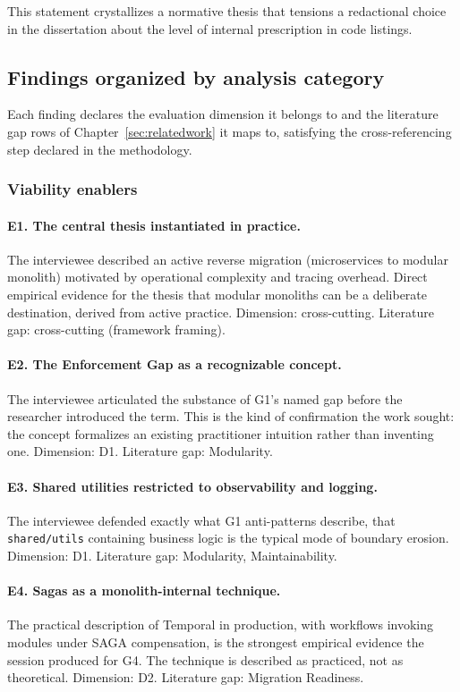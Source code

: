 This statement crystallizes a normative thesis that tensions a redactional choice in the dissertation about the level of internal prescription in code listings.

\subsection*{Findings organized by analysis category}

Each finding declares the evaluation dimension it belongs to and the literature gap rows of Chapter~\ref{sec:relatedwork} it maps to, satisfying the cross-referencing step declared in the methodology.

\subsubsection*{Viability enablers}

\paragraph*{E1. The central thesis instantiated in practice.} The interviewee described an active reverse migration (microservices to modular monolith) motivated by operational complexity and tracing overhead. Direct empirical evidence for the thesis that modular monoliths can be a deliberate destination, derived from active practice. Dimension: cross-cutting. Literature gap: cross-cutting (framework framing).

\paragraph*{E2. The Enforcement Gap as a recognizable concept.} The interviewee articulated the substance of G1's named gap before the researcher introduced the term. This is the kind of confirmation the work sought: the concept formalizes an existing practitioner intuition rather than inventing one. Dimension: D1. Literature gap: Modularity.

\paragraph*{E3. Shared utilities restricted to observability and logging.} The interviewee defended exactly what G1 anti-patterns describe, that \texttt{shared/utils} containing business logic is the typical mode of boundary erosion. Dimension: D1. Literature gap: Modularity, Maintainability.

\paragraph*{E4. Sagas as a monolith-internal technique.} The practical description of Temporal in production, with workflows invoking modules under SAGA compensation, is the strongest empirical evidence the session produced for G4. The technique is described as practiced, not as theoretical. Dimension: D2. Literature gap: Migration Readiness.


